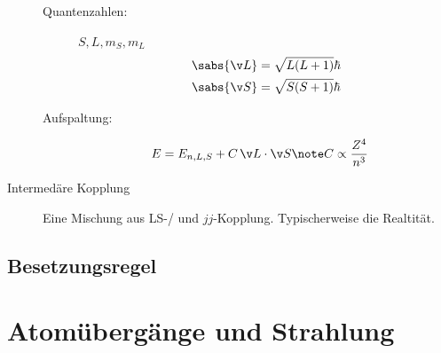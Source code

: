 \documentclass[twocolumn]{summery_4.1}
\begin{document}
\begin{description}
\begin{description}
        \item[Quantenzahlen:] \(S,L,m_S, m_L \)
        \begin{align*}
            \sabs{\v L} &= \sqrt{L(L+1)}\hbar\\
            \sabs{\v S} &= \sqrt{S(S+1)}\hbar
        \end{align*} 
        \item[Aufspaltung:]
        \item[] \begin{align*}
            E &= E_{n,L,S} + C \,\v L \cdot \v S \note C\propto \frac{Z^4}{n^3}
        \end{align*}
    \end{description} 
    \item[Intermedäre Kopplung]
    Eine Mischung aus LS-/ und \(jj\)-Kopplung. Typischerweise die Realtität.
\end{description}

\subsection{Besetzungsregel}

\section{Atomübergänge und Strahlung}
\end{document}
